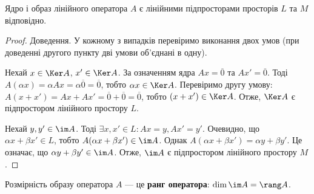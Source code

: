 \begin{claim}
	Ядро і образ лінійного оператора $A$ є лінійними підпросторами просторів
	$L$ та $M$ відповідно.
\end{claim}
\begin{proof}
	Доведення. У кожному з випадків перевіримо виконання двох умов (при
	доведенні другого пункту дві умови об’єднані в одну).

	Нехай $x \in \Ker A$, $x' \in \Ker A$. За означенням ядра $A x = \overline{0}$ та $A x' = \overline{0}$. Тоді
	$A(\alpha x) = \alpha A x = \alpha \overline{0} = \overline{0}$, тобто $\alpha x \in \Ker A$. Перевіримо другу умову:
	$A(x + x') = A x + A x' = \overline{0} + \overline{0} = \overline{0}$, тобто $(x + x') \in \Ker A$. Отже, $\Ker A$ є
	підпростором лінійного простору $L$.

	Нехай $y, y' \in \im A$. Тоді $\exists x, x' \in L: Ax = y, Ax' = y'$. Очевидно, що
	$\alpha x + \beta x' \in L$, тобто $A(\alpha x + \beta x') \in \im A$. Однак $A(\alpha x + \beta x') = \alpha y + \beta y'$. Це
	означає, що $\alpha y + \beta y' \in \im A$. Отже, $\im A$ є підпростором лінійного простору $M$. 
\end{proof}

\begin{definition}
	Розмірність образу оператора $A$ --- це \textbf{ранг оператора}:
	$\dim \im A = \rang A$.
\end{definition}

